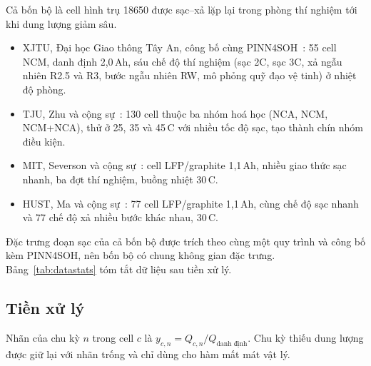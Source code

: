 Cả bốn bộ là cell hình trụ 18650 được sạc--xả lặp lại trong phòng thí nghiệm tới khi dung lượng giảm sâu.
\begin{itemize}
\item XJTU, Đại học Giao thông Tây An, công bố cùng PINN4SOH~\cite{wang2024}: 55 cell NCM, danh định 2,0\,Ah, sáu chế độ
      thí nghiệm (sạc 2C, sạc 3C, xả ngẫu nhiên R2.5 và R3, bước ngẫu nhiên RW, mô phỏng quỹ đạo vệ tinh) ở nhiệt độ phòng.
\item TJU, Zhu và cộng sự~\cite{zhu2022}: 130 cell thuộc ba nhóm hoá học (NCA, NCM, NCM+NCA), thử ở 25, 35 và
      45\,\textdegree C với nhiều tốc độ sạc, tạo thành chín nhóm điều kiện.
\item MIT, Severson và cộng sự~\cite{severson2019}: cell LFP/graphite 1,1\,Ah, nhiều giao thức sạc nhanh, ba đợt thí
      nghiệm, buồng nhiệt 30\,\textdegree C.
\item HUST, Ma và cộng sự~\cite{ma2022}: 77 cell LFP/graphite 1,1\,Ah, cùng chế độ sạc nhanh và 77 chế độ xả nhiều bước
      khác nhau, 30\,\textdegree C.
\end{itemize}
Đặc trưng đoạn sạc của cả bốn bộ được trích theo cùng một quy trình và công bố kèm PINN4SOH, nên bốn bộ có chung không
gian đặc trưng. Bảng~\ref{tab:datastats} tóm tắt dữ liệu sau tiền xử lý.



\subsection{Tiền xử lý}\label{sec:prep}

Nhãn của chu kỳ $n$ trong cell $c$ là $y_{c,n} = Q_{c,n}/Q_\text{danh định}$. Chu kỳ thiếu dung lượng được giữ lại với
nhãn trống và chỉ dùng cho hàm mất mát vật lý.

